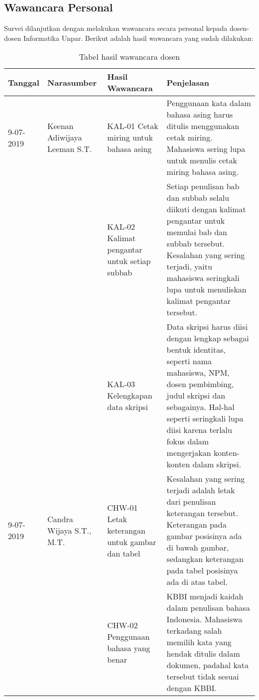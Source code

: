 \subsection{Wawancara Personal}
Survei dilanjutkan dengan melakukan wawancara secara personal kepada dosen-dosen Informatika Unpar. Berikut adalah hasil wawancara yang sudah dilakukan:

\begin{table}[H]
	\caption {Tabel hasil wawancara dosen} \label{tab:hasil_wawancara}
	\begin{center}
		\begin{tabular}{|p{2 cm}|>{\raggedright} p{3.5 cm}| p{4 cm}| p{5 cm}|}
		\hline
		Tanggal & Narasumber & Hasil Wawancara & Penjelasan \\ 
		\hline
		9-07-2019 & Keenan Adiwijaya Leeman S.T. & KAL-01 \newline Cetak miring untuk bahasa asing & Penggunaan kata dalam bahasa asing harus ditulis menggunakan cetak miring. Mahasiswa sering lupa untuk menulis cetak miring bahasa asing. \newline \\ 
		\hline
		 & & KAL-02 \newline Kalimat pengantar untuk setiap subbab & Setiap penulisan bab dan subbab selalu diikuti dengan kalimat pengantar untuk memulai bab dan subbab tersebut. Kesalahan yang sering terjadi, yaitu mahasiswa seringkali lupa untuk menuliskan kalimat pengantar tersebut. \newline \\ 
		\hline 
		 & & KAL-03 \newline Kelengkapan data skripsi & Data skripsi harus diisi dengan lengkap sebagai bentuk identitas, seperti nama mahasiswa, NPM, dosen pembimbing, judul skripsi dan sebagainya. Hal-hal seperti seringkali lupa diisi karena terlalu fokus dalam mengerjakan konten-konten dalam skripsi. \newline \\
		\hline
		9-07-2019 & Candra Wijaya S.T., M.T. & CHW-01 \newline Letak keterangan untuk gambar dan tabel & Kesalahan yang sering terjadi adalah letak dari penulisan keterangan tersebut. Keterangan pada gambar posisinya ada di bawah gambar, sedangkan keterangan pada tabel posisinya ada di atas tabel. \newline \\ 
		\hline
		 & & CHW-02 \newline Penggunaan bahasa yang benar & KBBI menjadi kaidah dalam penulisan bahasa Indonesia. Mahasiswa terkadang salah memilih kata yang hendak ditulis dalam dokumen, padahal kata tersebut tidak sesuai dengan KBBI. \newline \\ 
		\hline
		\end{tabular}
	\end{center}
\end{table}

